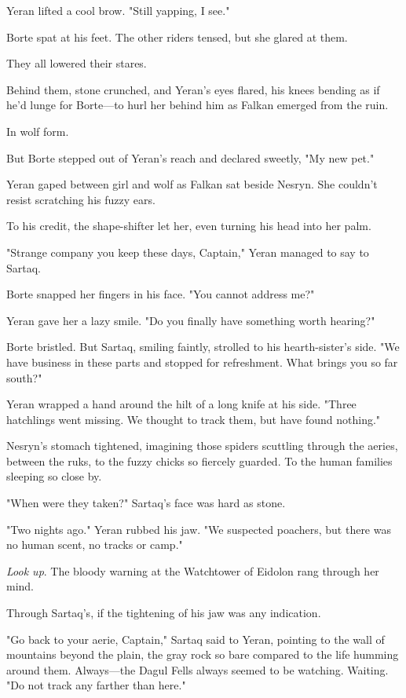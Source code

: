 Yeran lifted a cool brow.
"Still yapping, I see."

Borte spat at his feet.
The other riders tensed, but she glared at them.

They all lowered their stares.

Behind them, stone crunched, and Yeran's eyes flared, his knees bending as if he'd lunge for Borte---to hurl her behind him as Falkan emerged from the ruin.

In wolf form.

But Borte stepped out of Yeran's reach and declared sweetly, "My new pet."

Yeran gaped between girl and wolf as Falkan sat beside Nesryn.
She couldn't resist scratching his fuzzy ears.

To his credit, the shape-shifter let her, even turning his head into her palm.

"Strange company you keep these days, Captain," Yeran managed to say to Sartaq.

Borte snapped her fingers in his face.
"You cannot address me?"

Yeran gave her a lazy smile.
"Do you finally have something worth hearing?"

Borte bristled.
But Sartaq, smiling faintly, strolled to his hearth-sister's side.
"We have business in these parts and stopped for refreshment.
What brings you so far south?"

Yeran wrapped a hand around the hilt of a long knife at his side.
"Three hatchlings went missing.
We thought to track them, but have found nothing."

Nesryn's stomach tightened, imagining those spiders scuttling through the aeries, between the ruks, to the fuzzy chicks so fiercely guarded.
To the human families sleeping so close by.

"When were they taken?"
Sartaq's face was hard as stone.

"Two nights ago."
Yeran rubbed his jaw.
"We suspected poachers, but there was no human scent, no tracks or camp."

\emph{Look up}.
The bloody warning at the Watchtower of Eidolon rang through her mind.

Through Sartaq's, if the tightening of his jaw was any indication.

"Go back to your aerie, Captain," Sartaq said to Yeran, pointing to the wall of mountains beyond the plain, the gray rock so bare compared to the life humming around them.
Always---the Dagul Fells always seemed to be watching.
Waiting.
"Do not track any farther than here."


